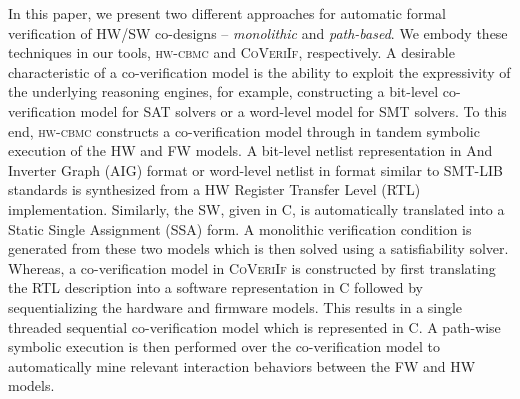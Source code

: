 \documentclass[sigconf]{acmart}
\newcommand{\tool}[1]{\textsc{#1}\xspace}
\newcommand{\hwcbmcv}{\tool{hw-cbmc}}
\newcommand{\verifox}{\tool{CoVeriIf}}
\begin{document}
In this paper, we present two different approaches for automatic formal
verification of HW/SW co-designs -- \emph{monolithic} and \emph{path-based}.  
We embody these techniques in our tools, \hwcbmcv and \verifox, respectively. 
A desirable characteristic of a co-verification model is the ability to exploit 
the expressivity of the underlying reasoning engines, for example, constructing 
a bit-level co-verification model for SAT solvers or a word-level model for SMT 
solvers.  To this end, \hwcbmcv constructs a co-verification model through 
in tandem symbolic execution of the HW and FW models.  A bit-level 
netlist representation in And Inverter Graph (AIG) format or word-level netlist in
format similar to SMT-LIB standards is synthesized from a HW Register Transfer 
Level (RTL) implementation. Similarly, the SW, given in C, is automatically 
translated into a Static Single Assignment (SSA) form.  A monolithic verification 
condition is generated from these two models which is then solved using a 
satisfiability solver.  Whereas, a co-verification model in \verifox is constructed 
by first translating the RTL description into a software representation in C followed 
by sequentializing the hardware and firmware models.  This results in a single
threaded sequential co-verification model which is represented in C. A path-wise 
symbolic execution is then performed over the co-verification model to
automatically mine relevant interaction behaviors between the FW and HW models.   
\end{document}
